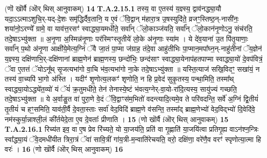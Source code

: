 \documentclass[17pt]{extarticle}
\begin{document}
                  \newline
                                                        (णॊ खॊर्वै fऒर् थिस् आनुवाकम्) \textbf{14} \newline \newline
                                \textbf{ T.A.2.15.1} \newline
                  तस्य॒ वा ए॒तस्य॑ य॒ज्ञ्स्य॒ द्वाव॑नद्ध्या॒यौ यदा॒ऽऽत्माऽशुचि॒र्-यद्-दे॒शः समृ॑द्धिर्दैव॒तानि॒ य ए॒वं ॅवि॒द्वान् म॑हारा॒त्र उ॒षस्युदि॑ते॒ व्रजꣳ॒॒स्तिष्ठ॒न्-नासी॑नः॒ शया॑नो॒ऽरण्ये᳚ ग्रामे॒ वा याव॑त्त॒रसꣳ॑ स्वाद्ध्या॒यमधी॑ते॒ सर्वा᳚न् ॅलो॒काञ्ज॑यति॒ सर्वा᳚न् ॅलो॒कान॑नृ॒णोऽनु॒ संच॑रति॒ तदे॒षाऽभ्यु॑क्ता ॥ अ॒नृ॒णा अ॒स्मिन्न॑नृ॒णाः पर॑स्मिꣳस्तृ॒तीये॑ लो॒के अ॑नृ॒णाः स्या॑म । ये दे॑व॒याना॑ उ॒त पि॑तृ॒याणाः॒ सर्वा᳚न् प॒थो अ॑नृ॒णा आक्षी॑ये॒मेत्य॒ग्निं ॅवै जा॒तं पा॒प्मा ज॑ग्राह॒ तंदे॒वा आहु॑तीभिः पा॒प्मान॒मपा᳚घ्न॒न्-नाहु॑तीनां ॅय॒ज्ञेन॑ य॒ज्ञ्स्य॒ दक्षि॑णाभि॒र्-दक्षि॑णानां ब्राह्म॒णेन॑ ब्राह्म॒णस्य॒ छन्दो॑भिः॒ छन्द॑साꣳ स्वाद्ध्या॒येनाप॑हतपाप्मा स्वाद्ध्या॒यो॑ दे॒वप॑वित्रं॒ ॅवा ए॒तत्तं ॅयोऽनू᳚थ् सृ॒जत्यभा॑गो वा॒चि भ॑व॒त्यभा॑गो ना॒के तदे॒षाऽभ्यु॑क्ता ॥ यस्ति॒त्याज॑ सखि॒विदꣳ॒॒ सखा॑यं॒ न तस्य॑ वा॒च्यपि॑ भा॒गो अ॑स्ति । यदीꣳ॑ शृ॒णोत्य॒लकꣳ॑ शृणोति॒ न हि प्र॒वेद॑ सुकृ॒तस्य॒ पन्था॒मिति॒ तस्मा᳚थ् स्वाद्ध्या॒योऽद्ध्ये॑त॒व्यो॑ यं ॅयं॑ क्र॒तुमधी॑ते॒ तेन॑ तेनास्ये॒ष्टं भ॑वत्य॒ग्नेर्-वा॒यो-रा॑दि॒त्यस्य॒ सायु॑ज्यं गच्छति॒ तदे॒षाऽभ्यु॑क्ता ॥  ये अ॒र्वाङु॒त वा॑ पुरा॒णे वे॒दं ॅवि॒द्वाꣳस॑म॒भितो॑ वदन्त्यादि॒त्यमे॒व ते परि॑वदन्ति॒ सर्वे॑ अ॒ग्निं द्वि॒तीयं॑ तृ॒तीयं॑ च हꣳ॒॒समिति॒ याव॑ती॒र्वै दे॒वता॒स्ताः सर्वा॑ वेद॒विदि॑ ब्राह्म॒णे व॑सन्ति॒ तस्मा᳚द् ब्राह्म॒णेभ्यो॑ वेद॒विद्भ्यो॑ दि॒वेदि॑वे॒ नम॑स्कुर्या॒न्नाश्ली॒लं की᳚र्तयेदे॒ता ए॒व दे॒वताः᳚ प्रीणाति । \textbf{ 15} \newline
                  \newline
                                                        (णो खॊर्वै fऒर् थिस् आनुवाकम्) \textbf{15} \newline \newline
                                \textbf{ T.A.2.16.1} \newline
                  रिच्य॑त इव॒ वा ए॒ष प्रेव रि॑च्यते॒ यो या॒जय॑ति॒ प्रति॑ वा गृ॒ह्णाति॑ या॒जयि॑त्वा प्रतिगृ॒ह्य वाऽन॑श्न॒न्त्रिः स्वा᳚द्ध्या॒यं ॅवे॒दमधी॑यीत त्रिरा॒त्रं ॅवा॑ सावि॒त्रीं गा॑य॒त्री-म॒न्वाति॑रेचयति॒ वरो॒ दक्षि॑णा॒ वरे॑णै॒व वरꣳ॑ स्पृणोत्या॒त्मा हि वरः॑ । \textbf{ 16} \newline
                  \newline
                                                        (णो खॊर्वै fऒर् थिस् आनुवाकम्) \textbf{16} \newline \newline
\end{document}
